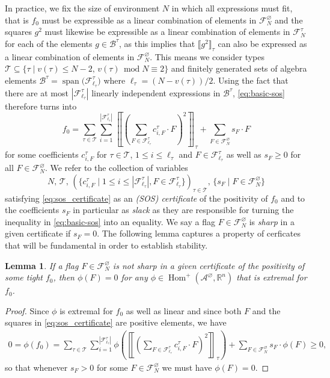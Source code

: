 \documentclass[a4paper,11pt]{article}
\newtheorem{lemma}[theorem]{Lemma}
\numberwithin{equation}{section}
\newcommand{\mA}{\mathcal{A}}
\newcommand{\mB}{\mathcal{B}}
\newcommand{\mF}{\mathcal{F}}
\newcommand{\mT}{\mathcal{T}}
\newcommand{\RR}{\mathbb{R}}
\begin{document}
In practice, we fix the size of environment $N$ in which all expressions must fit, that is $f_0$ must be expressible as a linear combination of elements in $\mF^\varnothing_N$ and the squares $g^2$ must likewise be expressible as a linear combination of elements in $\mF^\tau_N$ for each of the elements $g \in \mB^\tau$, as this implies that $\llbracket g^2 \rrbracket_\tau$ can also be expressed as a linear combination of elements in $\mF^\varnothing_N$. This means we consider types $\mT \subseteq \{ \tau \mid v(\tau) \leq N-2, \, v(\tau) \, \operatorname{mod} N \equiv 2 \}$ and finitely generated sets of algebra elements $\mB^\tau = \operatorname{span} \big( \mF^\tau_{ \ell_\tau } \big)$ where $\ell_\tau = (N - v(\tau)) / 2$. Using the fact that there are at most $|\mF^\tau_{ \ell_\tau }|$ linearly independent expressions in $\mB^\tau$, \cref{eq:basic-sos} therefore turns into
%
\begin{equation} \label{eq:sos_certificate}
    f_0 = \sum_{\tau \in \mT} \sum_{i = 1}^{|\mF^\tau_{ \ell_\tau }|} \left\llbracket \left( \sum_{F \in \mF^\tau_{ \ell_\tau }} c^\tau_{i, F} \cdot F \right)^2 \right\rrbracket_\tau + \sum_{F \in \mF^\varnothing_N} s_F \cdot F
\end{equation}
%
for some coefficients $c^\tau_{i, F}$ for $\tau \in \mT$, $1 \leq i \leq \ell_\tau$ and $F\in\mF^\tau_{\ell_\tau}$ as well as $s_F \geq 0$ for all $F \in \mF^\varnothing_N$. We refer to the collection of variables
%
\begin{equation*}
    N, \, \mT, \, (\{c_{i, F}^\tau \mid 1 \leq i \leq |\mF^\tau_{\ell_\tau}|, F \in \mF^\tau_{\ell_\tau} \} )_{\tau \in \mT}, \, \{ s_F \mid F \in \mF_N^\varnothing \}
\end{equation*}
%
satisfying \cref{eq:sos_certificate} as an \emph{(SOS) certificate} of the positivity of $f_0$ and to the coefficients $s_F$ in particular as \emph{slack} as they are responsible for turning the inequality in \cref{eq:basic-sos} into an equality. We say a flag $F \in \mF_N^\varnothing$ is \emph{sharp} in a given certificate if $s_F = 0$. The following lemma captures a property of cerficates that will be fundamental in order to establish stability.
%
\begin{lemma}
    If a flag $F \in \mF_N^\varnothing$ is not sharp in a given certificate of the positivity of some tight $f_0$, then $\phi (F) = 0$ for any $\phi \in \operatorname{Hom}^+(\mA^\varnothing, \RR^n)$ that is extremal for $f_0$.
\end{lemma}
%
\begin{proof}
    Since $\phi$ is extremal for $f_0$ as well as linear and since both $F$ and the squares in \cref{eq:sos_certificate} are positive elements, we have
    \begin{align*}
        0 = \phi(f_0) =  \sum_{\tau \in \mT}\sum_{i = 1}^{|\mF^\tau_{ \ell_\tau }|}  \phi \left(  \left\llbracket \left( \sum_{F \in \mF^\tau_{ \ell_\tau }} c^\tau_{i, F} \cdot F \right)^2 \right\rrbracket_\tau \right) + \sum_{F \in \mF^\varnothing_N} s_F \cdot \phi \left( F \right) \geq 0,
    \end{align*}
    so that whenever $s_F > 0$ for some $F \in \mF^\varnothing_N$ we must have $\phi(F) = 0$.
\end{proof}
\end{document}
